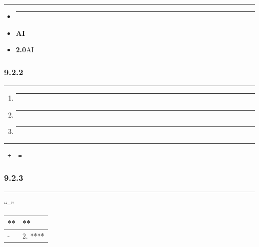 \begin{center}\rule{0.5\linewidth}{0.5pt}\end{center}

\begin{itemize}
\item
  \begin{center}\rule{0.5\linewidth}{0.5pt}\end{center}
\item
  \textbf{AI}
\item
  \textbf{2.0}AI
\end{itemize}

\subsubsection{9.2.2}\label{section-9}

\begin{center}\rule{0.5\linewidth}{0.5pt}\end{center}

\begin{enumerate}
\def\labelenumi{\arabic{enumi}.}
\item
  \begin{center}\rule{0.5\linewidth}{0.5pt}\end{center}
\item
  \begin{center}\rule{0.5\linewidth}{0.5pt}\end{center}
\item
  \begin{center}\rule{0.5\linewidth}{0.5pt}\end{center}
\end{enumerate}

\begin{center}\rule{0.5\linewidth}{0.5pt}\end{center}

\begin{verbatim}
 +  = 
\end{verbatim}

\subsubsection{9.2.3}\label{section-10}

\begin{center}\rule{0.5\linewidth}{0.5pt}\end{center}

``--''

\begin{longtable}[]{@{}ll@{}}
\toprule\noalign{}
** & ** \\
\midrule\noalign{}
\endhead
\bottomrule\noalign{}
\endlastfoot
- & 2. **** \\
\end{longtable}

